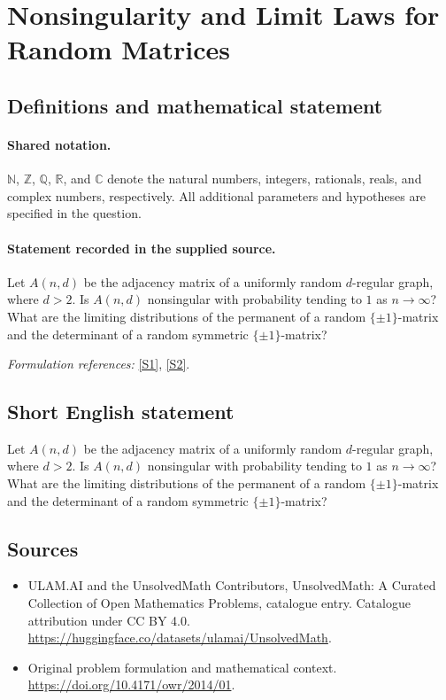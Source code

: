 \documentclass[11pt]{article}
\newcommand{\sref}[2]{\hyperlink{source:#1:#2}{[S#2]}}
\begin{document}
\section{Nonsingularity and Limit Laws for Random Matrices}\label{statement}

\subsection{Definitions and mathematical statement}

\paragraph{Shared notation.}$\mathbb N$, $\mathbb Z$, $\mathbb Q$, $\mathbb R$, and $\mathbb C$ denote the natural numbers, integers, rationals, reals, and complex numbers, respectively. All additional parameters and hypotheses are specified in the question.


\paragraph{Statement recorded in the supplied source.}
Let $A(n,d)$ be the adjacency matrix of a uniformly random $d$-regular graph, where $d>2$. Is $A(n,d)$ nonsingular with probability tending to $1$ as $n\to\infty$? What are the limiting distributions of the permanent of a random $\{\pm1\}$-matrix and the determinant of a random symmetric $\{\pm1\}$-matrix?
\par\smallskip\textit{Formulation references:} \sref{statement}{1}, \sref{statement}{2}.
\subsection{Short English statement}
Let $A(n,d)$ be the adjacency matrix of a uniformly random $d$-regular graph, where $d>2$. Is $A(n,d)$ nonsingular with probability tending to $1$ as $n\to\infty$? What are the limiting distributions of the permanent of a random $\{\pm1\}$-matrix and the determinant of a random symmetric $\{\pm1\}$-matrix?
\subsection{Sources}
\begin{itemize}
\item[\hypertarget{source:statement:1}{S1}] ULAM.AI and the UnsolvedMath Contributors, UnsolvedMath: A Curated Collection of Open Mathematics Problems, catalogue entry. Catalogue attribution under CC BY 4.0.
\url{https://huggingface.co/datasets/ulamai/UnsolvedMath}.
\item[\hypertarget{source:statement:2}{S2}] Original problem formulation and mathematical context.
\url{https://doi.org/10.4171/owr/2014/01}.
\end{itemize}
\label{end:statement}
\end{document}
